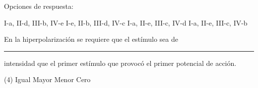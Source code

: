 \documentclass[12pt, letter]{exam}
\begin{document}
\begin{questions}
    Opciones de respuesta:
    \begin{multicols}{2}
    \begin{tasks}
        \task I-a, II-d, III-b, IV-e
        \task I-e, II-b, III-d, IV-c
        \task I-a, II-e, III-c, IV-d
        \task I-a, II-e, III-c, IV-b
    \end{tasks}
    \end{multicols}
    \question En la hiperpolarización se requiere que el estímulo sea de \rule{2cm}{0.1mm} intensidad que el primer estímulo que provocó el primer potencial de acción.
    \begin{tasks}(4)
        \task Igual
        \task Mayor
        \task Menor
        \task Cero
    \end{tasks} 

\end{questions}

\end{document}
